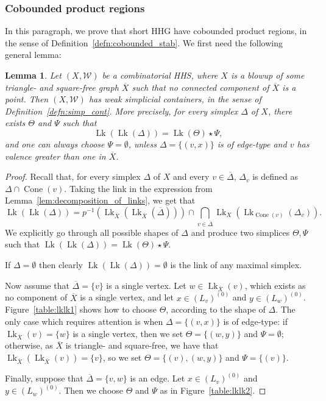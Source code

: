 \documentclass[svgnames]{amsart}
\theoremstyle{plain}
\newtheorem{lemma}[thm]{Lemma}
\theoremstyle{definition}
\newcommand{\ov}[1]{\overline{#1}}
\newcommand{\link}{\operatorname{Lk}}
\newcommand{\W}{\mathcal{W}}
\newcommand{\Squid}{\operatorname{Cone}}
\begin{document}
\subsubsection{Cobounded product regions}
In this paragraph, we prove that short HHG have cobounded product regions, in the sense of Definition~\ref{defn:cobounded_stab}. We first need the following general lemma:
\begin{lemma}\label{lem:simplicial_cont_for_squid}
    Let $(X,\W)$ be a combinatorial HHS, where $X$ is a blowup of some triangle- and square-free graph $\ov X$ such that no connected component of $\ov X$ is a point. Then $(X,\W)$ has weak simplicial containers, in the sense of Definition~\ref{defn:simp_cont}. More precisely, for every simplex $\Delta$ of $X$, there exists $\Theta$ and $\Psi$ such that 
    $$\link(\link(\Delta))=\link(\Theta)\star\Psi,$$
    and one can always choose $\Psi=\emptyset$, unless $\Delta=\{(v,x)\}$ is of edge-type and $v$ has valence greater than one in $\ov X$.
\end{lemma}
\begin{proof}
Recall that, for every simplex $\Delta$ of $X$ and every $v\in \ov\Delta$,  $\Delta_v$ is defined as $\Delta\cap\Squid(v)$. Taking the link in the expression from Lemma~\ref{lem:decomposition_of_links}, we get that 
$$\link(\link(\Delta))=p^{-1}(\link_{\ov X}(\link_{\ov X}(\ov\Delta)))\cap\bigcap_{v\in\ov\Delta}\link_X(\link_{\Squid(v)}(\Delta_v)).$$
We explicitly go through all possible shapes of $\Delta$ and produce two simplices $\Theta, \Psi$  such that $\link(\link(\Delta))=\link(\Theta)\star\Psi$.

If $\Delta=\emptyset$ then clearly $\link(\link(\Delta))=\emptyset$ is the link of any maximal simplex.

Now assume that $\ov\Delta=\{v\}$ is a single vertex. Let $w\in\link_{\ov X}(v)$, which exists as no component of $\ov X$ is a single vertex, and let $x\in (L_v)^{(0)}$ and $y\in (L_w)^{(0)}$. Figure~\eqref{table:lklk1} shows how to choose $\Theta$, according to the shape of $\Delta$. The only case which requires attention is when $\Delta=\{(v,x)\}$ is of edge-type: if $\link_{\ov X}(v)=\{w\}$ is a single vertex, then we set $\Theta=\{(w,y)\}$ and $\Psi=\emptyset$; otherwise, as $\ov X$ is triangle- and square-free, we have that $\link_{\ov X}(\link_{\ov X}(v))=\{v\}$, so we set $\Theta=\{(v), (w,y)\}$ and $\Psi=\{(v)\}$.

Finally, suppose that $\ov\Delta=\{v,w\}$ is an edge. Let $x\in (L_v)^{(0)}$ and $y\in (L_w)^{(0)}$. Then we choose $\Theta$ and $\Psi$ as in Figure~\eqref{table:lklk2}.
\end{proof}
\end{document}
